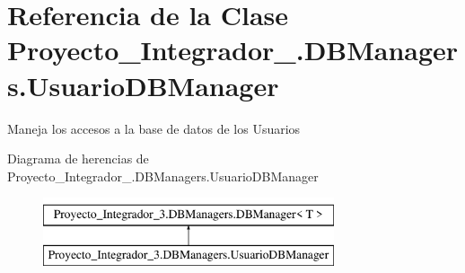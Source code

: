 \hypertarget{class_proyecto___integrador__3_1_1_d_b_managers_1_1_usuario_d_b_manager}{\section{Referencia de la Clase Proyecto\-\_\-\-Integrador\-\_.\-D\-B\-Managers.\-Usuario\-D\-B\-Manager}
\label{class_proyecto___integrador__3_1_1_d_b_managers_1_1_usuario_d_b_manager}
}


Maneja los accesos a la base de datos de los Usuarios  


Diagrama de herencias de Proyecto\-\_\-\-Integrador\-\_.\-D\-B\-Managers.\-Usuario\-D\-B\-Manager\begin{figure}[H]
\begin{center}
\leavevmode
\includegraphics[height=2.000000cm]{da/dfe/class_proyecto___integrador__3_1_1_d_b_managers_1_1_usuario_d_b_manager}
\end{center}
\end{figure}
